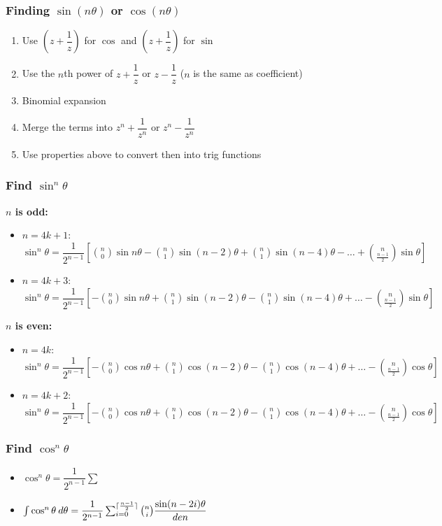\subsubsection{Finding $\sin (n\theta)$ or $\cos (n\theta)$}
\begin{enumerate}
	\item Use $(z+\dfrac{1}{z})$ for $\cos$ and $(z+\dfrac{1}{z})$ for $\sin$
	\item Use the $n$th power of $z+\dfrac{1}{z}$ or $z-\dfrac{1}{z}$ ($n$ is the same as coefficient)
	\item Binomial expansion
	\item Merge the terms into $z^n+\dfrac{1}{z^n}$ or $z^n-\dfrac{1}{z^n}$
	\item Use properties above to convert then into trig functions
\end{enumerate}
\subsubsection{Find $\sin^n\theta$}
\textbf{$n$ is odd:}
\begin{itemize}
	\item $n=4k+1$: $\sin^n\theta=\dfrac{1}{2^{n-1}}[\binom{n}{0}\sin n\theta - \binom{n}{1}\sin (n-2)\theta + \binom{n}{1}\sin (n-4)\theta - \dots + \binom{n}{\frac{n-1}{2}}\sin \theta]$
	\item $n=4k+3$: $\sin^n\theta=\dfrac{1}{2^{n-1}}[-\binom{n}{0}\sin n\theta + \binom{n}{1}\sin (n-2)\theta - \binom{n}{1}\sin (n-4)\theta + \dots - \binom{n}{\frac{n-1}{2}}\sin \theta]$
\end{itemize}
\textbf{$n$ is even:}
\begin{itemize}
	\item $n=4k$: $\sin^n\theta=\dfrac{1}{2^{n-1}}[-\binom{n}{0}\cos n\theta + \binom{n}{1}\cos (n-2)\theta - \binom{n}{1}\cos (n-4)\theta + \dots - \binom{n}{\frac{n-1}{2}}\cos \theta]$
	\item $n=4k+2$: $\sin^n\theta=\dfrac{1}{2^{n-1}}[-\binom{n}{0}\cos n\theta + \binom{n}{1}\cos (n-2)\theta - \binom{n}{1}\cos (n-4)\theta + \dots - \binom{n}{\frac{n-1}{2}}\cos \theta]$
\end{itemize}
\subsubsection{Find $\cos^n\theta$}
\begin{itemize}
	\item $\cos^n\theta = \dfrac{1}{2^{n-1}}\sum$
	\item $\int \cos^n\theta \: d\theta = \dfrac{1}{2^{n-1}} \sum_{i=0}^{\lceil\frac{n-1}{2}\rceil} \binom{n}{i} \dfrac{\sin (n-2i)\theta}{den}$
\end{itemize}


